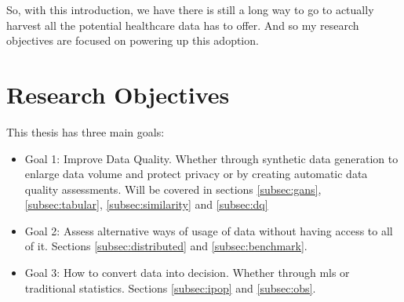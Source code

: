 So, with this introduction, we have there is still a long way to go to actually harvest all the potential healthcare data has to offer. And so my research objectives are focused on powering up this adoption.
\section{Research Objectives}
This thesis has three main goals:
%









\begin{itemize}
    \item Goal 1: Improve Data Quality. Whether through synthetic data generation to enlarge data volume and protect privacy or by creating automatic data quality assessments. Will be covered in sections \ref{subsec:gans}, \ref{subsec:tabular}, \ref{subsec:similarity} and \ref{subsec:dq}

    \item Goal 2: Assess alternative ways of usage of data without having access to all of it. Sections \ref{subsec:distributed} and \ref{subsec:benchmark}.

    \item Goal 3: How to convert data into decision. Whether through \acp{ml} or traditional statistics. Sections \ref{subsec:ipop} and \ref{subsec:obs}.
\end{itemize}